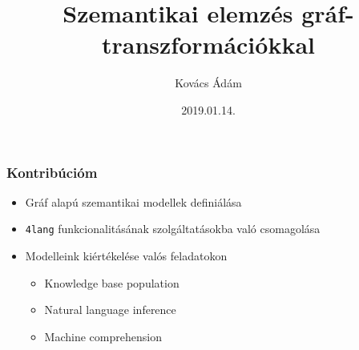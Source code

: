 \documentclass[bigger]{beamer}
\begin{document}
\title{Szemantikai elemz\'es gr\'af-transzform\'aci\'okkal}
\author{Kov\'acs \'Ad\'am}

\date{2019.01.14.}


\begin{frame} 

\titlepage 

\end{frame} 


\begin{frame} 

    \frametitle{Kontribúcióm} 
    \begin{itemize}
        \pause \item Gráf alapú szemantikai modellek definiálása
        \pause \item \texttt{4lang} funkcionalitásának szolgáltatásokba való csomagolása
        \pause \item Modelleink kiértékelése valós feladatokon
        \begin{itemize}
        	\item Knowledge base population \citep{Kovacs:2018}
        	\item Natural language inference
        	\item Machine comprehension \citep{Kovacs:2018b}
        \end{itemize}
    \end{itemize}

\end{frame} 
\end{document}
